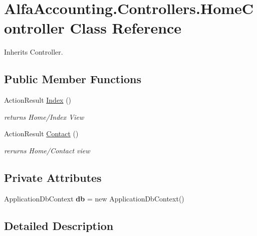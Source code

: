 \hypertarget{class_alfa_accounting_1_1_controllers_1_1_home_controller}{}\section{Alfa\+Accounting.\+Controllers.\+Home\+Controller Class Reference}
\label{class_alfa_accounting_1_1_controllers_1_1_home_controller}


 




Inherits Controller.

\subsection*{Public Member Functions}
\begin{DoxyCompactItemize}
\item 
Action\+Result \hyperlink{class_alfa_accounting_1_1_controllers_1_1_home_controller_a1c6b240848a9e77a0352a88de2811e5b}{Index} ()
\begin{DoxyCompactList}\small\item\em returns Home/\+Index View \end{DoxyCompactList}\item 
Action\+Result \hyperlink{class_alfa_accounting_1_1_controllers_1_1_home_controller_aeb7c1282acbfe22ed6a6d268f70be973}{Contact} ()
\begin{DoxyCompactList}\small\item\em rerurns Home/\+Contact view \end{DoxyCompactList}\end{DoxyCompactItemize}
\subsection*{Private Attributes}
\begin{DoxyCompactItemize}
\item 
\mbox{\label{class_alfa_accounting_1_1_controllers_1_1_home_controller_ac5db4b54c8c443555d03b4bea9d25635}} 
Application\+Db\+Context {\bfseries db} = new Application\+Db\+Context()
\end{DoxyCompactItemize}


\subsection{Detailed Description}


